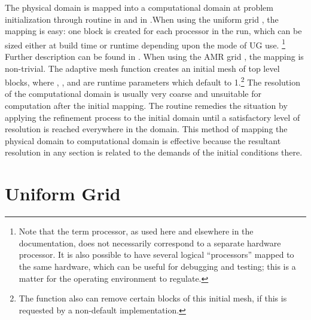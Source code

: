 The physical domain is mapped into a computational domain at problem
initialization through routine  in
\Paramesh and  in .When
using the uniform grid , the mapping is easy: one block is
created for each 
processor in the run, which can be sized either at build time or
runtime depending upon the mode of UG use. \footnote{Note that the
term processor, as used here and elsewhere in the 
documentation, does not necessarily correspond to a separate hardware
processor. It is also possible to have several logical ``processors''
mapped to the same hardware, which can be useful for debugging and
testing; this is a matter for the operating environment to regulate.} 
Further description can be found in .
When using the AMR grid \Paramesh, the mapping is non-trivial.
The adaptive mesh  function creates an
initial mesh of  top level blocks,
where , , and 
are runtime parameters which default to 1.\footnote{The
 function also can remove certain blocks of
this initial mesh, if this is requested by a non-default
 implementation.}
The resolution of the computational domain is usually very coarse and
unsuitable for computation after the initial mapping. The
 routine remedies the situation by applying the
refinement process to the initial domain until a satisfactory level of
resolution is reached everywhere in the domain. This method of mapping
the physical domain to computational domain is effective because the
resultant resolution in any section is related to the demands of the
initial conditions there. 



 

\section{Uniform Grid} 
\label{Sec:Grid UG} 

